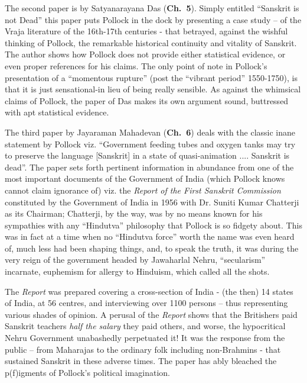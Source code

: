 The second paper is by Satyanarayana Das ({\bf Ch.~5}). Simply entitled “Sanskrit is not Dead” this paper puts Pollock in the dock by presenting a case study – of the Vraja literature of the 16th-17th centuries - that betrayed, against the wishful thinking of Pollock, the remarkable historical continuity and vitality of Sanskrit. The author shows how Pollock does not provide either statistical evidence, or even proper references for his claims. The only point of note in Pollock’s presentation of a “momentous rupture” (post the “vibrant period'' 1550-1750), is that it is just sensational-in lieu of being really sensible. As against the whimsical claims of Pollock, the paper of Das makes its own argument sound, buttressed with apt statistical evidence.

The third paper by Jayaraman Mahadevan ({\bf Ch.~6}) deals with the classic inane statement by Pollock viz. “Government feeding tubes and oxygen tanks may try to preserve the language [Sanskrit] in a state of quasi-animation .... Sanskrit is dead”. The paper sets forth pertinent information in abundance from one of the most important documents of the Government of India (which Pollock knows cannot claim ignorance of) viz. the {\sl Report of the First Sanskrit Commission} constituted by the Government of India in 1956 with Dr. Suniti Kumar Chatterji as its Chairman; Chatterji, by the way, was by no means known for his sympathies with any “Hindutva” philosophy that Pollock is so fidgety about. This was in fact at a time when no “Hindutva force” worth the name was even heard of, much less had been shaping things, and, to speak the truth, it was during the very reign of the government headed by Jawaharlal Nehru, “secularism” incarnate, euphemism for allergy to Hinduism, which called all the shots.

The {\sl Report} was prepared covering a cross-section of India - (the then) 14 states of India, at 56 centres, and interviewing over 1100 persons – thus representing various shades of opinion. A perusal of the {\sl Report} shows that the Britishers paid Sanskrit teachers {\sl half the salary} they paid others, and worse, the hypocritical Nehru Government unabashedly perpetuated it! It was the response from the public – from Maharajas to the ordinary folk including non-Brahmins - that sustained Sanskrit in these adverse times. The paper has ably bleached the p(f)igments of Pollock’s political imagination.

